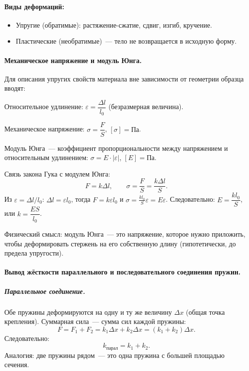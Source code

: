 \documentclass[12pt]{article}
\begin{document}
\paragraph{Виды деформаций:}
\begin{itemize}
	\item Упругие (обратимые): растяжение-сжатие, сдвиг, изгиб, кручение.
	\item Пластические (необратимые)~--- тело не возвращается в исходную форму.
\end{itemize}

\paragraph{Механическое напряжение и модуль Юнга.}

Для описания упругих свойств материала вне зависимости от геометрии образца вводят:
\begin{definition}
	Относительное удлинение: $\varepsilon = \dfrac{\Delta l}{l_0}$ (безразмерная величина).
\end{definition}
\begin{definition}
	Механическое напряжение: $\sigma = \dfrac{F}{S}$, $[\sigma] = \text{Па}$.
\end{definition}
\begin{definition}
	Модуль Юнга~--- коэффициент пропорциональности между напряжением и относительным удлинением: $\sigma = E \cdot |\varepsilon|$, $[E] = \text{Па}$.
\end{definition}

Связь закона Гука с модулем Юнга:
\[
	F = k \Delta l, \qquad \sigma = \frac{F}{S} = \frac{k\Delta l}{S}.
\]
Из $\varepsilon = \Delta l / l_0$: $\Delta l = \varepsilon l_0$, тогда $F = k\varepsilon l_0$ и $\sigma = \frac{k l_0}{S}\varepsilon = E\varepsilon$.
Следовательно: $E = \dfrac{k l_0}{S}$, или $k = \dfrac{ES}{l_0}$.

Физический смысл: модуль Юнга~--- это напряжение, которое нужно приложить, чтобы деформировать стержень на его собственную длину (гипотетически, до предела упругости).

\paragraph{Вывод жёсткости параллельного и последовательного соединения пружин.}

\subparagraph{Параллельное соединение.}
Обе пружины деформируются на одну и ту же величину $\Delta x$ (общая точка крепления). Суммарная сила~--- сумма сил каждой пружины:
\[
	F = F_1 + F_2 = k_1 \Delta x + k_2 \Delta x = (k_1 + k_2) \Delta x.
\]
Следовательно:
\[
	\boxed{k_{\text{парал}} = k_1 + k_2.}
\]
Аналогия: две пружины рядом~--- это одна пружина с большей площадью сечения.
\end{document}
